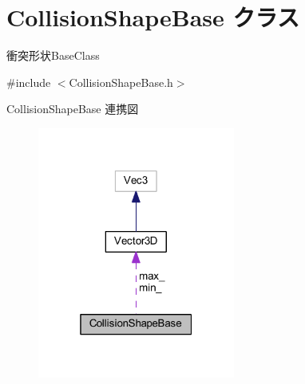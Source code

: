 \hypertarget{class_collision_shape_base}{}\section{Collision\+Shape\+Base クラス}
\label{class_collision_shape_base}


衝突形状\+Base\+Class  




{\ttfamily \#include $<$Collision\+Shape\+Base.\+h$>$}



Collision\+Shape\+Base 連携図\nopagebreak
\begin{figure}[H]
\begin{center}
\leavevmode
\includegraphics[width=184pt]{class_collision_shape_base__coll__graph}
\end{center}
\end{figure}
